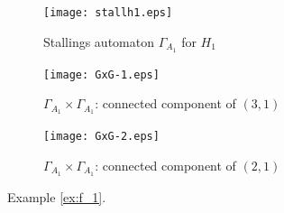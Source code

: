 \documentclass[a4paper,12pt]{article}
\newcommand{\G}{\Gamma }
\numberwithin{equation}{section}
\numberwithin{figure}{section}
\begin{document}
\begin{figure}
\begin{center}
\begin{subfigure}[b]{.25\columnwidth}
\texttt{[image: stallh1.eps]}
\caption{Stallings automaton $\G_{A_1}$ for $H_1$}
\label{fig:stall1}
\end{subfigure}
\hspace{5mm}
\begin{subfigure}[b]{.25\columnwidth}
\texttt{[image: GxG-1.eps]}
\caption{$\G_{A_1}\times \G_{A_1}$: connected component of $(3,1)$}
\label{fig:GxG-1}
\end{subfigure}
\hspace{5mm}
\begin{subfigure}[b]{.25\columnwidth}
\texttt{[image: GxG-2.eps]}
\caption{$\G_{A_1}\times \G_{A_1}$: connected component of $(2,1)$}
\label{fig:GxG-2}
\end{subfigure}
\end{center}
\caption{Example \ref{ex:f_1}.}\label{fig:stall}
\end{figure}
\end{document}
